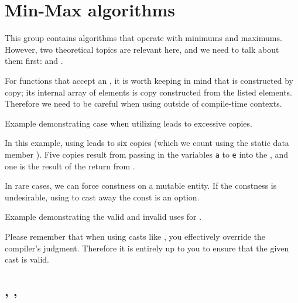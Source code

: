 \section{Min-Max algorithms}

This group contains algorithms that operate with minimums and maximums. However, two theoretical topics are relevant here, and we need to talk about them first:  and .

For functions that accept an , it is worth keeping in mind that  is constructed by copy; its internal array of elements is copy constructed from the listed elements. Therefore we need to be careful when using  outside of compile-time contexts.

\begin{codebox}[]{\href{https://compiler-explorer.com/z/14enPTMbj}{\ExternalLink}}
\footnotesize Example demonstrating case when utilizing  leads to excessive copies.
\tcblower
{}
\end{codebox}

In this example, using  leads to six copies (which we count using the static data member ). Five copies result from passing in the variables \texttt{a} to \texttt{e} into the , and one is the result of the return from .

In rare cases, we can force constness on a mutable entity. If the constness is undesirable, using  to cast away the const is an option.

\begin{codebox}[]{\href{https://compiler-explorer.com/z/64qvaf3cj}{\ExternalLink}}
\footnotesize Example demonstrating the valid and invalid uses for .
\tcblower
{}
\end{codebox}

Please remember that when using casts like , you effectively override the compiler's judgment. Therefore it is entirely up to you to ensure that the given cast is valid.

\subsection{\texorpdfstring{, , }{\texttt{std::min}, \texttt{std::max}, \texttt{std::minmax}}}

